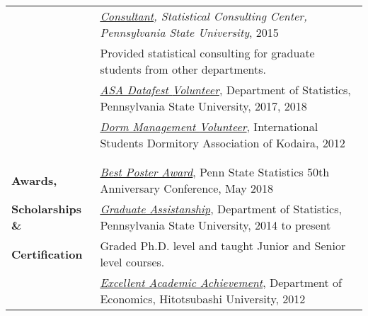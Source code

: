 \documentclass[utf8,letterpaper,oneside]{article}
\begin{document}
\begin{center}
\begin{tabular}{l l}
                           & \textit{\underline{{Consultant}}, Statistical Consulting Center, Pennsylvania State University}, 2015                                            \\
                           & Provided statistical consulting for graduate students from other departments.                                                                    \\
                           & \underline{\textit{ASA Datafest {Volunteer}}}, Department of Statistics, Pennsylvania State University, 2017, 2018                               \\
                           & \underline{\textit{Dorm Management {Volunteer}}}, International Students Dormitory Association of Kodaira, 2012                                  \\
                           &                                                                                                                                                  
  \\\hline
                           &                                                                                                                                                  \\
  \textbf{Awards, }        & \underline{{\textit{Best Poster Award}}}, Penn State Statistics 50th Anniversary Conference, May 2018                                            \\
  \textbf{Scholarships \&} & \underline{\textit{Graduate Assistanship}}, Department of Statistics, Pennsylvania State University, 2014 to present                             \\
  \textbf{Certification}   & {Graded Ph.D. level} and {taught Junior and Senior level} courses.                                                                               \\
                           & \underline{{\textit{Excellent Academic Achievement}}}, Department of Economics, Hitotsubashi University, 2012                                    \\
  

\end{tabular}
\end{center}
\end{document}
